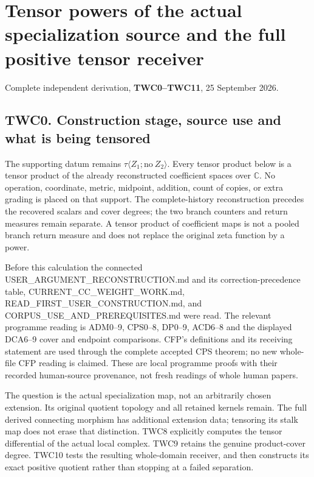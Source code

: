 \section{Tensor powers of the actual specialization source and the full
positive tensor
receiver}\label{tensor-powers-of-the-actual-specialization-source-and-the-full-positive-tensor-receiver}

Complete independent derivation, \textbf{TWC0--TWC11}, 25 September
2026.

\subsection{TWC0. Construction stage, source use and what is being
tensored}\label{twc0.-construction-stage-source-use-and-what-is-being-tensored}

The supporting datum remains
\(\tau\langle Z_1;\mathrm{no}\ Z_2\rangle\). Every tensor product below
is a tensor product of the already reconstructed coefficient spaces over
\(\mathbb C\). No operation, coordinate, metric, midpoint, addition,
count of copies, or extra grading is placed on that support. The
complete-history reconstruction precedes the recovered scalars and cover
degrees; the two branch counters and return measures remain separate. A
tensor product of coefficient maps is not a pooled branch return measure
and does not replace the original zeta function by a power.

Before this calculation the connected USER\_ARGUMENT\_RECONSTRUCTION.md
and its correction-precedence table, CURRENT\_CC\_WEIGHT\_WORK.md,
READ\_FIRST\_USER\_CONSTRUCTION.md, and
CORPUS\_USE\_AND\_PREREQUISITES.md were read. The relevant programme
reading is ADM0--9, CPS0--8, DP0--9, ACD6--8 and the displayed DCA6--9
cover and endpoint comparisons. CFP's definitions and its receiving
statement are used through the complete accepted CPS theorem; no new
whole-file CFP reading is claimed. These are local programme proofs with
their recorded human-source provenance, not fresh readings of whole
human papers.

The question is the actual specialization map, not an arbitrarily chosen
extension. Its original quotient topology and all retained kernels
remain. The full derived connecting morphism has additional extension
data; tensoring its stalk map does not erase that distinction. TWC8
explicitly computes the tensor differential of the actual local complex.
TWC9 retains the genuine product-cover degree. TWC10 tests the resulting
whole-domain receiver, and then constructs its exact positive quotient
rather than stopping at a failed separation.

